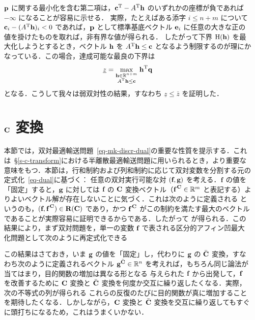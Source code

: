 \begin{rem}
$$$$
$\mathrm{\textbf{p}}$ に関する最小化を含む第二項は，${\mathrm{\textbf{c}}}^{\mathrm{T}}- {A}^{\mathrm{T}}\mathrm{\textbf{h}}$ のいずれかの座標が負であれば $-\infty$ になることが容易に示せる．
実際，たとえばある添字 $i\leq n+m$ について $\mathrm{\textbf{c}}_i-({A}^{\mathrm{T}}\mathrm{\textbf{h}})_i<0$ であれば，$\mathrm{\textbf{p}}$ として標準基底ベクトル $\mathrm{\textbf{e}}_i$ に任意の大きな正の値を掛けたものを取れば，非有界な値が得られる．
したがって下界 $\mathrm{H}(\mathrm{\textbf{h}})$ を最大化しようとするとき，ベクトル $\mathrm{\textbf{h}}$ を ${A}^{\mathrm{T}}\mathrm{\textbf{h}}\leq \mathrm{\textbf{c}}$ となるよう制限するのが理にかなっている．この場合，達成可能な最良の下界は $$\underline{z}=	\underset{\substack{\mathrm{\textbf{h}} \in \mathbb{R}^{n+m}\\{A}^{\mathrm{T}}\mathrm{\textbf{h}} \leq \mathrm{\textbf{c}}}}{\max}\;{\mathrm{\textbf{h}}}^{\mathrm{T}}\mathrm{\textbf{q}}$$ となる．こうして我々は弱双対性の結果，すなわち $\underline{z}\leq \bar{z}$ を証明した．
\end{rem}


\section{$\mathrm{\textbf{C}}$ 変換}\label{sec-c-transforms} 本節では，双対最適輸送問題~\eqref{eq-mk-discr-dual}の重要な性質を提示する．これは~\S\ref{s-c-transform}における半離散最適輸送問題に用いられるとき，より重要な意味をもつ．本節は，行和制約および列和制約に応じて双対変数を分割する元の定式化~\eqref{eq-dual}に基づく：
任意の双対実行可能な対 $(\mathrm{\textbf{f}},\mathrm{\textbf{g}})$ を考える．$\mathrm{\textbf{f}}$ の値を「固定」すると，$\mathrm{\textbf{g}}$ に対しては $\mathrm{\textbf{f}}$ の $\mathrm{\textbf{C}}$ 変換ベクトル（$\mathrm{\textbf{f}}^{\,\mathrm{\textbf{C}}}\in\mathbb{R}^m$ と表記する）よりよいベクトル解が存在しないことに気づく．これは次のように定義される
というのも，$(\mathrm{\textbf{f}},\mathrm{\textbf{f}}^{\,\mathrm{\textbf{C}}})\in\mathrm{\textbf{R}}(\mathrm{\textbf{C}})$ であり，かつ $\mathrm{\textbf{f}}^{\,\mathrm{\textbf{C}}}$ がこの制約を満たす最大のベクトルであることが実際容易に証明できるからである．したがって
\eq{\dotp{\fD}{\a} + \dotp{\gD}{\b} \leq \dotp{\fD}{\a} + \dotp{\fD^{\,\C}}{\b}}
が得られる．この結果により，まず双対問題を，単一の変数 $\mathrm{\textbf{f}}$ で表される区分的アフィン凹最大化問題として次のように再定式化できる

この結果はさておき，いま $\mathrm{\textbf{g}}$ の値を「固定」し，代わりに $\mathrm{\textbf{g}}$ の $\bar{\mathrm{\textbf{C}}}$ 変換，すなわち次のように定義されるベクトル $\mathrm{\textbf{g}}^{\bar{\mathrm{\textbf{C}}}}\in\mathbb{R}^n$
を考えれば，もちろん同じ論法が当てはまり，目的関数の増加は異なる形となる
与えられた $\mathrm{\textbf{f}}$ から出発して，$\mathrm{\textbf{f}}$ を改善するために $\mathrm{\textbf{C}}$ 変換と $\bar{\mathrm{\textbf{C}}}$ 変換を何度か交互に繰り返したくなる．実際，次の不等式の列が得られる
\eq{
	\dotp{\fD}{\a} + \dotp{\fD^{\,\C}}{\b} \leq \dotp{\fD^{\,\C\bar{\C}}}{\a} + \dotp{\fD^{\,\C}}{\b}\leq  \dotp{\fD^{\,\C\bar{\C}}}{\a} + \dotp{\fD^{\,\C\bar{\C}\C}}{\b}\leq  \dots
}
これらの反復のたびに目的関数が真に増加することを期待したくなる．しかしながら，$\mathrm{\textbf{C}}$ 変換と $\bar{\mathrm{\textbf{C}}}$ 変換を交互に繰り返してもすぐに頭打ちになるため，これはうまくいかない．


